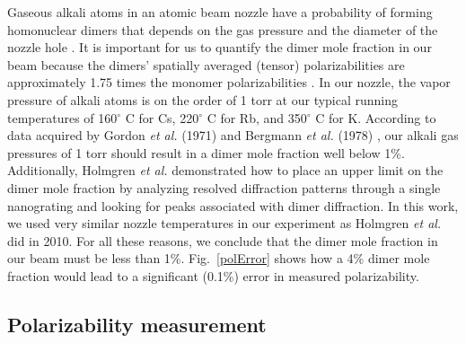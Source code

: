 \documentclass[twocolumn,pra,showpacs,superscriptaddress,longbibliography]{revtex4-1}   %
\newcommand{\figref}[1]{Fig.~\ref{#1}}
\newcommand{\etalspace}{\textit{et al. }}
\begin{document}
Gaseous alkali atoms in an atomic beam nozzle have a probability of forming homonuclear dimers that depends on the gas pressure \cite{Gordon1971} and the diameter of the nozzle hole \cite{Bergmann1978}. It is important for us to quantify the dimer mole fraction in our beam because the dimers' spatially averaged (tensor) polarizabilities are approximately 1.75 times the monomer polarizabilities \cite{Tarnovsky1993}. 
In our nozzle, the vapor pressure of alkali atoms is on the order of 1 torr at our typical running temperatures of 
160$^{\circ}$ C for Cs, 220$^{\circ}$ C for Rb, and 350$^{\circ}$ C for K.
According to data acquired by Gordon \etalspace (1971) \cite{Gordon1971} and Bergmann \etalspace (1978) \cite{Bergmann1978}, our alkali gas pressures of 1 torr should result in a dimer mole fraction well below 1\%.
Additionally, Holmgren \etalspace \cite{Holmgren2010,Holmgren2013} demonstrated how to place an upper limit on the dimer mole fraction by analyzing resolved diffraction patterns through a single nanograting and looking for peaks associated with dimer diffraction. In this work, we used very similar nozzle temperatures in our experiment as Holmgren \etalspace did in 2010. For all these reasons, we conclude that the dimer mole fraction in our beam must be less than 1\%.
\figref{polError} shows how a 4\% dimer mole fraction would lead to a significant (0.1\%) error in measured polarizability.


\subsection{Polarizability measurement} \label{sectionPolarizability}
\end{document}
